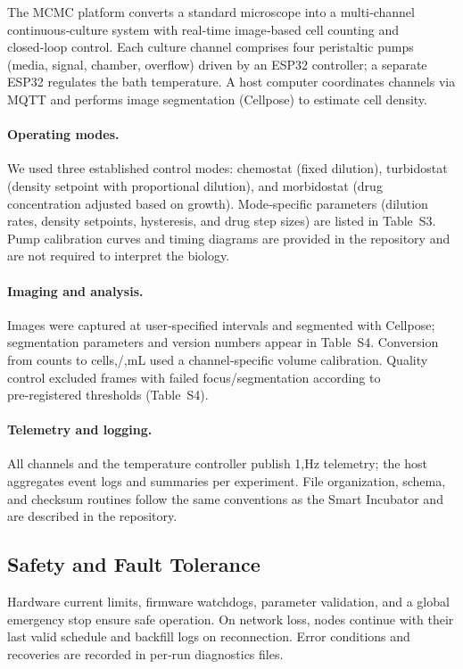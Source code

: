 \documentclass[aps,pre,twocolumn,floatfix,nofootinbib,amsmath,amssymb]{revtex4-2}
\begin{document}
The MCMC platform converts a standard microscope into a multi‑channel continuous‑culture system with real‑time image‑based cell counting and closed‑loop control. Each culture channel comprises four peristaltic pumps (media, signal, chamber, overflow) driven by an ESP32 controller; a separate ESP32 regulates the bath temperature. A host computer coordinates channels via MQTT and performs image segmentation (Cellpose) to estimate cell density.

\paragraph{Operating modes.} We used three established control modes: chemostat (fixed dilution), turbidostat (density setpoint with proportional dilution), and morbidostat (drug concentration adjusted based on growth). Mode‑specific parameters (dilution rates, density setpoints, hysteresis, and drug step sizes) are listed in Table~S3. Pump calibration curves and timing diagrams are provided in the repository and are not required to interpret the biology.

\paragraph{Imaging and analysis.} Images were captured at user‑specified intervals and segmented with Cellpose; segmentation parameters and version numbers appear in Table~S4. Conversion from counts to cells,/,mL used a channel‑specific volume calibration. Quality control excluded frames with failed focus/segmentation according to pre‑registered thresholds (Table~S4).

\paragraph{Telemetry and logging.} All channels and the temperature controller publish 1,Hz telemetry; the host aggregates event logs and summaries per experiment. File organization, schema, and checksum routines follow the same conventions as the Smart Incubator and are described in the repository.

\subsection{Safety and Fault Tolerance }

Hardware current limits, firmware watchdogs, parameter validation, and a global emergency stop ensure safe operation. On network loss, nodes continue with their last valid schedule and backfill logs on reconnection. Error conditions and recoveries are recorded in per‑run diagnostics files.
\end{document}
